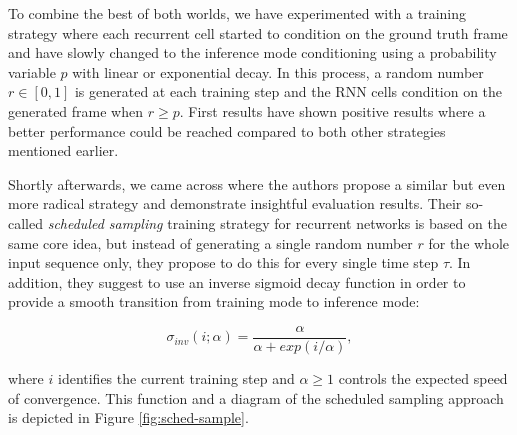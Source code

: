 To combine the best of both worlds, we have experimented with a training strategy where each recurrent cell started to condition on the ground truth frame and have slowly changed to the inference mode conditioning using a probability variable $p$ with linear or exponential decay. In this process, a random number $r \in [0, 1]$ is generated at each training step and the RNN cells condition on the generated frame when $r \geq p$. First results have shown positive results where a better performance could be reached compared to both other strategies mentioned earlier. 

Shortly afterwards, we came across \parencite{sched_sample} where the authors propose a similar but even more radical strategy and demonstrate insightful evaluation results. Their so-called \textit{scheduled sampling} training strategy for recurrent networks is based on the same core idea, but instead of generating a single random number $r$ for the whole input sequence only, they propose to do this for every single time step $\tau$. In addition, they suggest to use an inverse sigmoid decay function in order to provide a smooth transition from training mode to inference mode:

\begin{equation} \label{eq:inverse-sigmoid}
\sigma_{inv}(i; \alpha) = \frac{\alpha}{\alpha + exp(i / \alpha)} ,
\end{equation}

where $i$ identifies the current training step and $\alpha \geq 1$ controls the expected speed of convergence. This function and a diagram of the scheduled sampling approach is depicted in Figure \ref{fig:sched-sample}.

